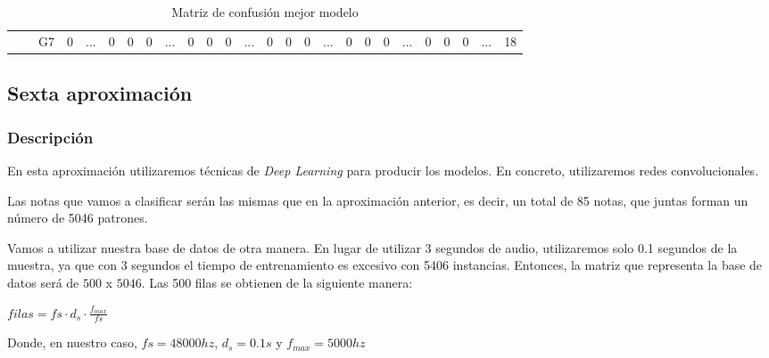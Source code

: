 \documentclass[12pt]{article}
\begin{document}
\begin{table}[!ht]
{\begin{tabular}{clcccccccccccccccccccccccc}
									& \multicolumn{1}{l|}{} & \multicolumn{1}{c|}{G7}   & \multicolumn{1}{c|}{0}    & \multicolumn{1}{c|}{...}                  & \multicolumn{1}{c|}{0}    & \multicolumn{1}{c|}{0}    & \multicolumn{1}{c|}{0}  & \multicolumn{1}{c|}{...}                  & \multicolumn{1}{c|}{0}  & \multicolumn{1}{c|}{0}  & \multicolumn{1}{c|}{0}  & \multicolumn{1}{c|}{...}                  & \multicolumn{1}{c|}{0}    & \multicolumn{1}{c|}{0}    & \multicolumn{1}{c|}{0}    & \multicolumn{1}{c|}{...}                  & \multicolumn{1}{c|}{0}  & \multicolumn{1}{c|}{0}  & \multicolumn{1}{c|}{0}    & \multicolumn{1}{c|}{...}                  & \multicolumn{1}{c|}{0}    & \multicolumn{1}{c|}{0}    & \multicolumn{1}{c|}{0}  & \multicolumn{1}{c|}{...}                  & \multicolumn{1}{c|}{18} \\ \cline{3-26} 
		\end{tabular}	
	}
	\caption{Matriz de confusión mejor modelo}
	\label{Tab:confusion_matrix_5}
\end{table}


\subsection{Sexta aproximación}
\label{Sexta aproximación}

\subsubsection{Descripción}

En esta aproximación utilizaremos técnicas de \textit{Deep Learning} para producir los modelos.
En concreto, utilizaremos redes convolucionales.

\bigskip
Las notas que vamos a clasificar serán las mismas que en la aproximación anterior, es decir, un total de 
85 notas, que juntas forman un número de 5046 patrones.

\bigskip
Vamos a utilizar nuestra base de datos de otra manera. En lugar de utilizar 3 segundos de audio, utilizaremos
solo 0.1 segundos de la muestra, ya que con 3 segundos el tiempo de entrenamiento es excesivo con 
5406 instancias. Entonces, la matriz que representa la base de datos será de $500$ x $5046$. Las 500 filas
se obtienen de la siguiente manera: 

\bigskip
$filas = fs \cdot d_s \cdot \frac{f_{max}}{fs}$ 

\bigskip
Donde, en nuestro caso, $fs = 48000hz$, $d_s = 0.1s$ y $f_{max} = 5000hz$
\end{document}
